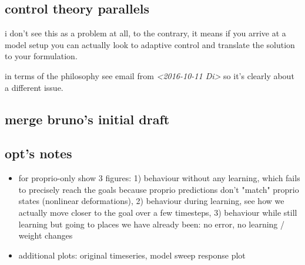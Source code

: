 \documentclass[11pt]{llncs}
\begin{document}
\subsection{control theory parallels}
\label{sec:org316353f}

i don't see this as a problem at all, to the contrary, it means if you
arrive at a model setup you can actually look to adaptive control and
translate the solution to your formulation.

in terms of the philosophy see email from \textit{<2016-10-11 Di> } so it's
clearly about a different issue.

\subsection{merge bruno's initial draft}
\label{sec:org6e00d89}


\subsection{opt's notes}
\label{sec:org35938d1}
\begin{itemize}
\item for proprio-only show 3 figures: 1) behaviour without any learning,
which fails to precisely reach the goals because proprio
predictions don't "match" proprio states (nonlinear
deformations), 2) behaviour during learning, see how we actually
move closer to the goal over a few timesteps, 3) behaviour while
still learning but going to places we have already been: no error,
no learning / weight changes
\item additional plots: original timeseries, model sweep response plot
\end{itemize}



\end{document}
